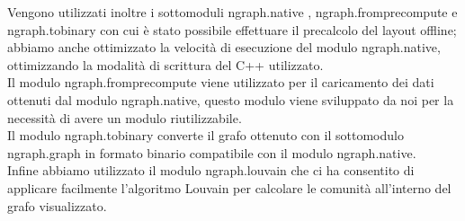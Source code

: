 Vengono utilizzati inoltre i sottomoduli ngraph.native \cite{ngraph.native}, ngraph.fromprecompute \cite{ngraph.fromprecompute} e ngraph.tobinary \cite{ngraph.tobinary} con cui è stato possibile effettuare il precalcolo del layout offline; abbiamo anche ottimizzato la velocità di esecuzione del modulo ngraph.native, ottimizzando la modalità di scrittura del C++ utilizzato.\\
Il modulo ngraph.fromprecompute viene utilizzato per il caricamento dei dati ottenuti dal modulo ngraph.native, questo modulo viene sviluppato da noi per la necessità di avere un modulo riutilizzabile.\\
Il modulo ngraph.tobinary converte il grafo ottenuto con il sottomodulo ngraph.graph in formato binario compatibile con il modulo ngraph.native.\\
Infine abbiamo utilizzato il modulo ngraph.louvain \cite{ngraph.tobinary} che ci ha consentito di applicare facilmente l'algoritmo Louvain per calcolare le comunità all'interno del grafo visualizzato.
